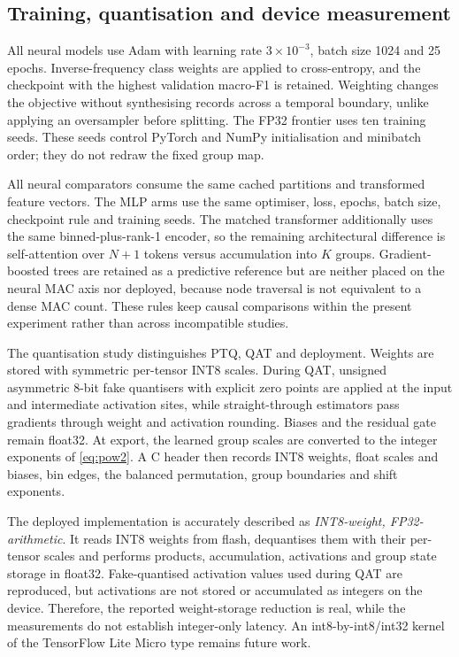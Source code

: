 \documentclass[10pt,letterpaper,twocolumn]{article}
\begin{document}
\subsection{Training, quantisation and device measurement}
\label{sec:method:training}

All neural models use Adam with learning rate $3\times10^{-3}$, batch size
1024 and 25 epochs. Inverse-frequency class weights are applied to
cross-entropy, and the checkpoint with the highest validation macro-F1 is
retained. Weighting changes the objective without synthesising records across
a temporal boundary, unlike applying an oversampler before splitting. The
FP32 frontier uses ten training seeds. These seeds control PyTorch and NumPy
initialisation and minibatch order; they do not redraw the fixed group map.

All neural comparators consume the same cached partitions and transformed
feature vectors. The MLP arms use the same optimiser, loss, epochs, batch size,
checkpoint rule and training seeds. The matched transformer additionally uses
the same binned-plus-rank-1 encoder, so the remaining architectural difference
is self-attention over $N+1$ tokens versus accumulation into $K$ groups.
Gradient-boosted trees are retained as a predictive reference but are neither
placed on the neural MAC axis nor deployed, because node traversal is not
equivalent to a dense MAC count. These rules keep causal comparisons within
the present experiment rather than across incompatible studies.

The quantisation study distinguishes PTQ, QAT and deployment. Weights are
stored with symmetric per-tensor INT8 scales. During QAT, unsigned asymmetric
8-bit fake quantisers with explicit zero points are applied at the input and
intermediate activation sites, while straight-through estimators pass gradients
through weight and activation rounding. Biases and the residual gate remain
float32. At export, the learned group scales are converted to the integer
exponents of \eqref{eq:pow2}. A C header then records INT8 weights, float
scales and biases, bin edges, the balanced permutation, group boundaries and
shift exponents.

The deployed implementation is accurately described as \emph{INT8-weight,
FP32-arithmetic}. It reads INT8 weights from flash, dequantises them with their
per-tensor scales and performs products, accumulation, activations and group
state storage in float32. Fake-quantised activation values used during QAT are
reproduced, but activations are not stored or accumulated as integers on the
device. Therefore, the reported weight-storage reduction is real, while the
measurements do not establish integer-only latency. An int8-by-int8/int32
kernel of the TensorFlow Lite Micro type \cite{david2021tflm} remains future
work.
\end{document}
